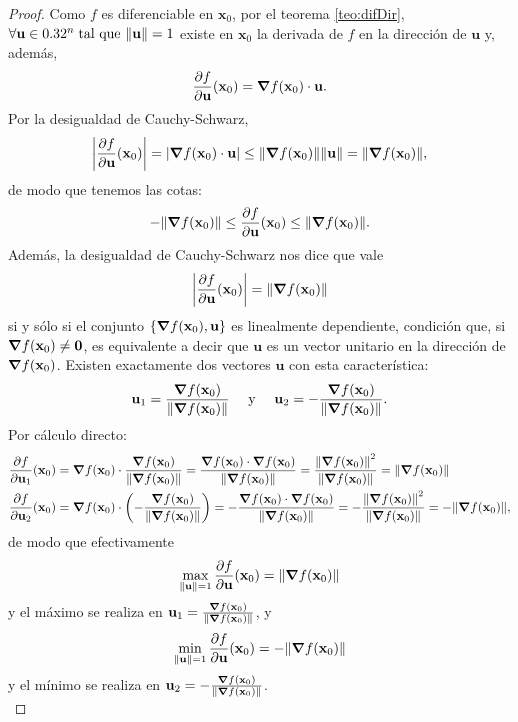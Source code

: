 \begin{theorem}
\begin{proof}
 Como $f$ es diferenciable en $\mathbf{x}_0$, por el teorema \eqref{teo:difDir}, $\forall {\mathbf{u}} \in 0.32^n\;\text{tal que } \norm{{\mathbf{u}}} = 1$ existe en $\mathbf{x}_0$ la derivada de $f$ en la direcci\'on de ${\mathbf{u}}$ y, adem\'as,
\[
 \frac{\partial f}{\partial {\mathbf{u}}} (\mathbf{x}_0) = \grad f (\mathbf{x}_0) \cdot {\mathbf{u}}.
\]
Por la desigualdad de Cauchy-Schwarz, 
\[
 \abs{\frac{\partial f}{\partial {\mathbf{u}}} (\mathbf{x}_0)} = \abs{\grad f (\mathbf{x}_0) \cdot {\mathbf{u}}} \le \norm{\grad f (\mathbf{x}_0)}\norm{{\mathbf{u}}} = \norm{\grad f (\mathbf{x}_0)},
\]
de modo que tenemos las cotas:
\[
 -\norm{\grad f (\mathbf{x}_0)} \le \frac{\partial f}{\partial {\mathbf{u}}}(\mathbf{x}_0) \le \norm{\grad f (\mathbf{x}_0)}.
\]
Adem\'as, la desigualdad de Cauchy-Schwarz nos dice que vale
\[
 \abs{\frac{\partial f}{\partial {\mathbf{u}}} (\mathbf{x}_0)} = \norm{\grad f (\mathbf{x}_0)}
\]
si y s\'olo si el conjunto $\{\grad f(\mathbf{x}_0), {\mathbf{u}} \}$ es linealmente dependiente, condici\'on que, si $\grad f(\mathbf{x}_0) \ne \mathbf{0}$, es equivalente a decir que ${\mathbf{u}}$ es un vector unitario en la direcci\'on de $\grad f(\mathbf{x}_0)$. Existen exactamente dos vectores ${\mathbf{u}}$ con esta caracter\'istica:
\[
 {\mathbf{u}}_1 = \frac{\grad f(\mathbf{x}_0)}{\norm{\grad f(\mathbf{x}_0)}} \quad \text{ y } \quad {\mathbf{u}}_2 = -\frac{\grad f(\mathbf{x}_0)}{\norm{\grad f(\mathbf{x}_0)}}.
\]
Por c\'alculo directo:
\begin{align*}
 \frac{\partial f}{\partial {\mathbf{u}}_1} (\mathbf{x}_0) &= \grad f (\mathbf{x}_0) \cdot \frac{\grad f(\mathbf{x}_0)}{\norm{\grad f(\mathbf{x}_0)}} = \frac{ \grad f (\mathbf{x}_0) \cdot \grad f(\mathbf{x}_0) }{\norm{\grad f(\mathbf{x}_0)}} = \frac{\norm{\grad f (\mathbf{x}_0)}^2 }{\norm{\grad f(\mathbf{x}_0)}} = \norm{\grad f (\mathbf{x}_0)} \\
%  
 \frac{\partial f}{\partial {\mathbf{u}}_2} (\mathbf{x}_0) &= \grad f (\mathbf{x}_0) \cdot \left( - \frac{\grad f(\mathbf{x}_0)}{\norm{\grad f(\mathbf{x}_0)}} \right) = -\frac{ \grad f (\mathbf{x}_0) \cdot \grad f(\mathbf{x}_0) }{\norm{\grad f(\mathbf{x}_0)}} = -\frac{\norm{\grad f (\mathbf{x}_0)}^2 }{\norm{\grad f(\mathbf{x}_0)}} = -\norm{\grad f (\mathbf{x}_0)},
\end{align*}
de modo que efectivamente
\[
 \max_{\norm{{\mathbf{u}}}=1} \frac{\partial f}{\partial {\mathbf{u}}} (\mathbf{x}_0) = \norm{\grad f (\mathbf{x}_0)}
\]
y el m\'aximo se realiza en ${\mathbf{u}}_1 = \frac{\grad f(\mathbf{x}_0)}{\norm{\grad f(\mathbf{x}_0)}}$,
y
\[
 \min_{\norm{{\mathbf{u}}}=1} \frac{\partial f}{\partial {\mathbf{u}}} (\mathbf{x}_0) = -\norm{\grad f (\mathbf{x}_0)}
\]
y el m\'inimo se realiza en ${\mathbf{u}}_2 = -\frac{\grad f(\mathbf{x}_0)}{\norm{\grad f(\mathbf{x}_0)}}$. \\


\end{proof}
\end{theorem}
